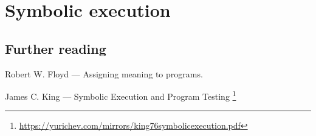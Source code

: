 \section{Symbolic execution}




\subsection{Further reading}

Robert W. Floyd --- Assigning meaning to programs.

James C. King --- Symbolic Execution and Program Testing
\footnote{\url{https://yurichev.com/mirrors/king76symbolicexecution.pdf}}

